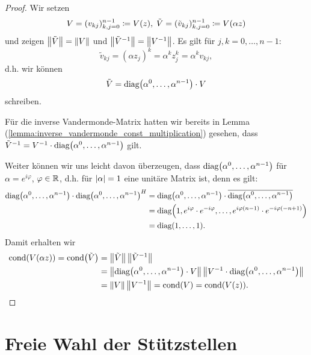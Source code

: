 \begin{proof}
    Wir setzen
    \[
        V = (v_{kj})_{k,j=0}^{n-1} \coloneqq \text{$V(z)$}, \;
        \tilde{V} = (\tilde{v}_{kj})_{k,j=0}^{n-1} \coloneqq \text{$V(\alpha z)$}
    \]
    und zeigen $\left\lVert \tilde{V} \right\rVert = \left\lVert V \right\rVert$ und
    $\left\lVert \tilde{V}^{-1} \right\rVert = \left\lVert V^{-1} \right\rVert$.
    Es gilt für $j,k = 0,\dots,n-1$:
    \[
        \tilde{v}_{kj} = (\alpha z_j)^k = \alpha^k z_j^k = \alpha^k v_{kj},
    \]
    d.h. wir können
    \[
        \tilde{V} = \text{diag$ \left( \alpha^0, \dots, \alpha^{n-1} \right)$} \cdot V
    \]
    schreiben.

    \noindent Für die inverse Vandermonde-Matrix hatten wir bereits in
    Lemma (\ref{lemma:inverse_vandermonde_const_multiplication})
    gesehen, dass $ \tilde{V}^{-1} = V^{-1} \cdot \text{diag$ \left( \alpha^{0}, \dots, \alpha^{n-1} \right)$} $ gilt.

    \noindent Weiter können wir uns leicht davon überzeugen, dass
    $\text{diag$ \left( \alpha^0, \dots, \alpha^{n-1} \right)$}$
    für $\alpha = e^{i\varphi}$, $\varphi \in \mathbb{R}$, d.h. für $\left\lvert \alpha \right\rvert = 1$
    eine unitäre Matrix ist, denn es gilt:
    \[
        \begin{split}
               \text{diag$ \left( \alpha^0, \dots, \alpha^{n-1} \right)$} \cdot \text{diag$ \left( \alpha^0, \dots, \alpha^{n-1} \right)$}^{H}
            &= \text{diag$ \left( \alpha^0, \dots, \alpha^{n-1} \right)$} \cdot \overline{\text{diag$ \left( \alpha^0, \dots, \alpha^{n-1} \right)$}}\\
            &= \text{diag$ \left( 1, e^{i\varphi} \cdot e^{-i\varphi}, \dots, e^{i\varphi (n-1)} \cdot e^{-i \varphi (-n+1)} \right)$}\\
            &= \text{diag$ \left( 1, \dots, 1 \right)$}.
        \end{split}
    \]
    Damit erhalten wir
    \[
        \begin{split}
            \text{cond$ \left( \text{$V(\alpha z)$} \right)$}
            = \text{cond$ \left( \tilde{V} \right)$}
            &= \left\lVert \tilde{V} \right\rVert \left\lVert \tilde{V}^{-1} \right\rVert\\
            &= \left\lVert \text{diag$ \left( \alpha^0, \dots, \alpha^{n-1} \right)$} \cdot V \right\rVert \left\lVert V^{-1} \cdot \text{diag$ \left( \alpha^0, \dots, \alpha^{n-1} \right)$} \right\rVert\\
            &= \left\lVert V \right\rVert \left\lVert V^{-1} \right\rVert
            = \text{cond$ \left( V \right)$} = \text{cond$ \left( \text{$V(z)$} \right)$}.
        \end{split}
    \]
\end{proof}

\section{Freie Wahl der Stützstellen}
